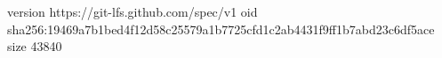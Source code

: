 version https://git-lfs.github.com/spec/v1
oid sha256:19469a7b1bed4f12d58c25579a1b7725cfd1c2ab4431f9ff1b7abd23c6df5ace
size 43840
